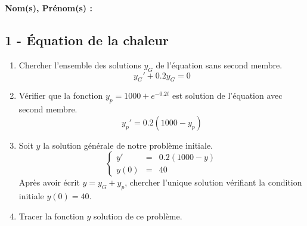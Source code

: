 \documentclass[12pt]{article}
\begin{document}

\setlength{\columnseprule}{1pt}

\textbf{Nom(s), Prénom(s) :}

\subsection*{1 - Équation de la chaleur}



\begin{enumerate}
\item Chercher l'ensemble des solutions $y_G$ de l'équation sans second membre.
  $$ y_G' + 0.2y_G = 0 $$
\item Vérifier que la fonction $y_p = 1000 + e^{-0.2t}$ est solution de l'équation avec second membre. 
  $$ y_p' = 0.2(1000 - y_p) $$
\item Soit $y$ la solution générale de notre problème initiale.
  \begin{equation*}
    \left\lbrace
    \begin{array}{ccc}
      y'   &=& 0.2(1000 - y)\\
      y(0) &=& 40
    \end{array}\right.
  \end{equation*}
  Après avoir écrit $y = y_G + y_p$, chercher l'unique solution vérifiant la condition initiale $y(0) = 40$. 
\item Tracer la fonction $y$ solution de ce problème.
\end{enumerate}
\end{document}
